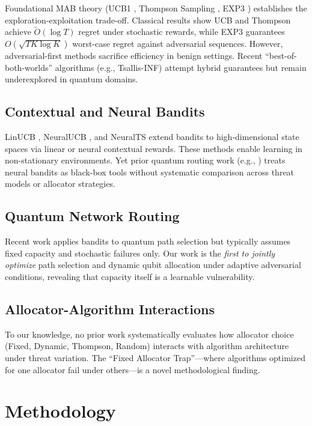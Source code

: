 \documentclass[10pt,twocolumn,journal]{IEEEtran}
\begin{document}
Foundational MAB theory (UCB1 \cite{auer2002ucb1}, Thompson Sampling \cite{thompson1933}, EXP3 \cite{auer2002exp3}) establishes the exploration-exploitation trade-off. Classical results show UCB and Thompson achieve $\tilde{O}(\log T)$ regret under stochastic rewards, while EXP3 guarantees $O(\sqrt{T K \log K})$ worst-case regret against adversarial sequences. However, adversarial-first methods sacrifice efficiency in benign settings. Recent ``best-of-both-worlds'' algorithms (e.g., Tsallis-INF) attempt hybrid guarantees but remain underexplored in quantum domains.

\subsection{Contextual and Neural Bandits}

LinUCB \cite{abbasi2011}, NeuralUCB \cite{zhou2020neuralucb}, and NeuralTS \cite{zhang2020neuralts} extend bandits to high-dimensional state spaces via linear or neural contextual rewards. These methods enable learning in non-stationary environments. Yet prior quantum routing work (e.g., \cite{coopmans2021benchmark}) treats neural bandits as black-box tools without systematic comparison across threat models or allocator strategies.

\subsection{Quantum Network Routing}

Recent work applies bandits to quantum path selection \cite{wang2025learning} but typically assumes fixed capacity and stochastic failures only. Our work is the \textit{first to jointly optimize} path selection and dynamic qubit allocation under adaptive adversarial conditions, revealing that capacity itself is a learnable vulnerability.

\subsection{Allocator-Algorithm Interactions}

To our knowledge, no prior work systematically evaluates how allocator choice (Fixed, Dynamic, Thompson, Random) interacts with algorithm architecture under threat variation. The ``Fixed Allocator Trap''—where algorithms optimized for one allocator fail under others—is a novel methodological finding.

\section{Methodology}
\label{sec:method}
\end{document}
